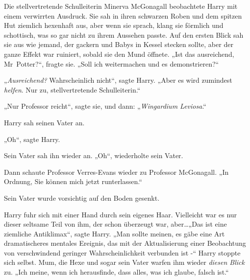 Die stellvertretende Schulleiterin Minerva McGonagall beobachtete Harry mit einem verwirrten Ausdruck. Sie sah in ihren schwarzen Roben und dem spitzen Hut ziemlich hexenhaft aus, aber wenn sie sprach, klang sie förmlich und schottisch, was so gar nicht zu ihrem Aussehen passte. Auf den ersten Blick sah sie aus wie jemand, der gackern und Babys in Kessel stecken sollte, aber der ganze Effekt war ruiniert, sobald sie den Mund öffnete. „Ist das ausreichend, Mr~Potter?“, fragte sie. „Soll ich weitermachen und es demonstrieren?“

„\emph{Ausreichend?} Wahrscheinlich nicht“, sagte Harry. „Aber es wird zumindest \emph{helfen}. Nur zu, stellvertretende Schulleiterin.“

„Nur Professor reicht“, sagte sie, und dann: „\emph{Wingardium Leviosa}.“

Harry sah seinen Vater an.

„Oh“, sagte Harry.

Sein Vater sah ihn wieder an. „Oh“, wiederholte sein Vater.

Dann schaute Professor Verres-Evans wieder zu Professor McGonagall. „In Ordnung, Sie können mich jetzt runterlassen.“

Sein Vater wurde vorsichtig auf den Boden gesenkt.

Harry fuhr sich mit einer Hand durch sein eigenes Haar. Vielleicht war es nur dieser seltsame Teil von ihm, der schon überzeugt war, aber…„Das ist eine ziemliche Antiklimax“, sagte Harry. „Man sollte meinen, es gäbe eine Art dramatischeres mentales Ereignis, das mit der Aktualisierung einer Beobachtung von verschwindend geringer Wahrscheinlichkeit verbunden ist -“ Harry stoppte sich selbst. Mum, die Hexe und sogar sein Vater warfen ihm wieder \emph{diesen Blick} zu. „Ich meine, wenn ich herausfinde, dass alles, was ich glaube, falsch ist.“


